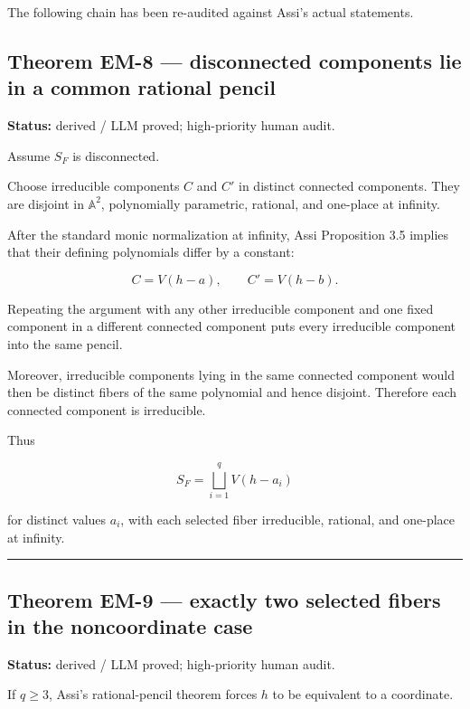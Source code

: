 The following chain has been re-audited against Assi's actual
statements.

\subsection{Theorem EM-8 --- disconnected components lie in a common
rational
pencil}\label{theorem-em-8-disconnected-components-lie-in-a-common-rational-pencil}

\textbf{Status:} derived / LLM proved; high-priority human audit.

Assume \(S_F\) is disconnected.

Choose irreducible components \(C\) and \(C'\) in distinct connected
components. They are disjoint in \(\mathbb A^2\), polynomially
parametric, rational, and one-place at infinity.

After the standard monic normalization at infinity, Assi Proposition 3.5
implies that their defining polynomials differ by a constant:

\[
C=V(h-a),\qquad
C'=V(h-b).
\]

Repeating the argument with any other irreducible component and one
fixed component in a different connected component puts every
irreducible component into the same pencil.

Moreover, irreducible components lying in the same connected component
would then be distinct fibers of the same polynomial and hence disjoint.
Therefore each connected component is irreducible.

Thus

\[
\boxed{
S_F=\bigsqcup_{i=1}^q V(h-a_i)
}
\]

for distinct values \(a_i\), with each selected fiber irreducible,
rational, and one-place at infinity.

\begin{center}\rule{0.5\linewidth}{0.5pt}\end{center}

\subsection{Theorem EM-9 --- exactly two selected fibers in the
noncoordinate
case}\label{theorem-em-9-exactly-two-selected-fibers-in-the-noncoordinate-case}

\textbf{Status:} derived / LLM proved; high-priority human audit.

If \(q\ge3\), Assi's rational-pencil theorem forces \(h\) to be
equivalent to a coordinate.

